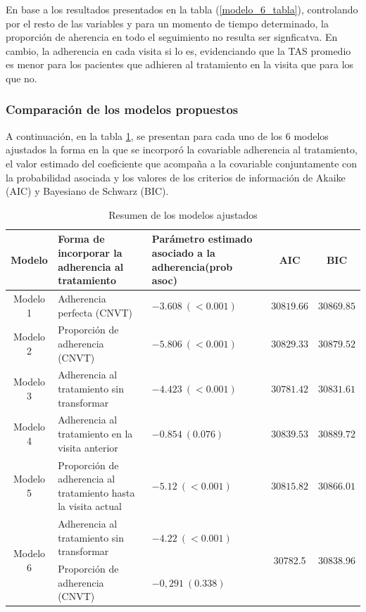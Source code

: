 \documentclass[spanish]{article}
\numberwithin{figure}{subsection}
\numberwithin{equation}{subsection}
\numberwithin{table}{subsection}
\begin{document}
En base a los resultados presentados en la tabla (\ref{modelo_6_tabla}),
controlando por el resto de las variables y para un momento de tiempo
determinado, la proporción de aherencia en todo el seguimiento no resulta ser
signficatva. En cambio, la adherencia en cada visita si lo es, evidenciando que
la TAS promedio es menor para los pacientes que adhieren al tratamiento en la
visita que para los que no.

\subsubsection{Comparación de los modelos propuestos}

A continuación, en la tabla \ref{comparacion}, se presentan para cada uno de los
6 modelos ajustados la forma en la que se incorporó la covariable adherencia al
tratamiento, el valor estimado del coeficiente que acompaña a la covariable
conjuntamente con la probabilidad asociada y los valores de los criterios de
información de Akaike (AIC) y Bayesiano de Schwarz (BIC).

\begin{table}[H]
	\centering
	\caption{Resumen de los modelos ajustados}
	\label{comparacion}
	\begin{tabular}{|c|p{5cm}|p{5cm}|c|c|}
		\hline
		Modelo & Forma de incorporar la adherencia al tratamiento & Parámetro estimado asociado a la adherencia(prob asoc) & AIC & BIC \\
		\hline
		Modelo 1 & Adherencia perfecta (CNVT) & $-3.608\ (<0.001)$ & $30819.66$ & $30869.85$ \\
		\hline
		Modelo 2 & Proporción de adherencia (CNVT) & $-5.806\ (<0.001)$ & $30829.33$ & $30879.52$ \\
		\hline
		Modelo 3 & Adherencia al tratamiento sin transformar & $-4.423\ (<0.001) $ & $30781.42$ & $30831.61$ \\
		\hline
		Modelo 4 & Adherencia al tratamiento en la visita anterior & $-0.854\ (0.076)$ & $30839.53$ & $30889.72$ \\
		\hline
		Modelo 5 & Proporción de adherencia al tratamiento hasta la visita actual & $-5.12\ (<0.001)$ & $30815.82$ & $30866.01$ \\
		\hline
		\multirow{2}{*}{Modelo 6}
		& Adherencia al tratamiento sin transformar & $-4.22\ (<0.001)$ & \multirow{2}{*}{30782.5} & \multirow{2}{*}{30838.96} \\
		\cline{2-3}
		& Proporción de adherencia (CNVT) & $-0,291\ (0.338)$ & & \\
		\hline
	\end{tabular}
\end{table}
\end{document}
